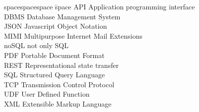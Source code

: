 
\begin{tabbing}
spacespacespace \= space \kill
API		\>	Application programming interface \\
DBMS	\>	Database Management System \\
JSON	\>	Javascript Object Notation \\
MIMI	\>	Multipurpose Internet Mail Extensions \\
noSQL	\> 	not only SQL \\
PDF		\> 	Portable Document Format \\
REST	\> 	Representational state transfer \\
SQL		\> 	Structured Query Language \\
TCP		\> 	Transmission Control Protocol \\
UDF		\> 	User Defined Function \\
XML		\>	Extensible Markup Language \\

\end{tabbing}
\endinput
